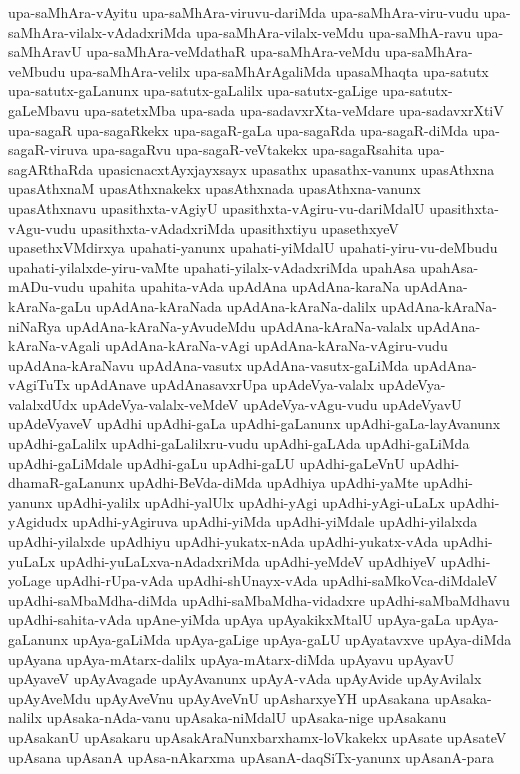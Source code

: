 {upa-saMhAra-vAyitu
upa-saMhAra-viruvu-dariMda
upa-saMhAra-viru-vudu
upa-saMhAra-vilalx-vAdadxriMda
upa-saMhAra-vilalx-veMdu
upa-saMhA-ravu
upa-saMhAravU
upa-saMhAra-veMdathaR
upa-saMhAra-veMdu
upa-saMhAra-veMbudu
upa-saMhAra-velilx
upa-saMhArAgaliMda
upasaMhaqta
upa-satutx
upa-satutx-gaLanunx
upa-satutx-gaLalilx
upa-satutx-gaLige
upa-satutx-gaLeMbavu
upa-satetxMba
upa-sada
upa-sadavxrXta-veMdare
upa-sadavxrXtiV
upa-sagaR
upa-sagaRkekx
upa-sagaR-gaLa
upa-sagaRda
upa-sagaR-diMda
upa-sagaR-viruva
upa-sagaRvu
upa-sagaR-veVtakekx
upa-sagaRsahita
upa-sagARthaRda
upasicnacxtAyxjayxsayx
upasathx
upasathx-vanunx
upasAthxna
upasAthxnaM
upasAthxnakekx
upasAthxnada
upasAthxna-vanunx
upasAthxnavu
upasithxta-vAgiyU
upasithxta-vAgiru-vu-dariMdalU
upasithxta-vAgu-vudu
upasithxta-vAdadxriMda
upasithxtiyu
upasethxyeV
upasethxVMdirxya
upahati-yanunx
upahati-yiMdalU
upahati-yiru-vu-deMbudu
upahati-yilalxde-yiru-vaMte
upahati-yilalx-vAdadxriMda
upahAsa
upahAsa-mADu-vudu
upahita
upahita-vAda
upAdAna
upAdAna-karaNa
upAdAna-kAraNa-gaLu
upAdAna-kAraNada
upAdAna-kAraNa-dalilx
upAdAna-kAraNa-niNaRya
upAdAna-kAraNa-yAvudeMdu
upAdAna-kAraNa-valalx
upAdAna-kAraNa-vAgali
upAdAna-kAraNa-vAgi
upAdAna-kAraNa-vAgiru-vudu
upAdAna-kAraNavu
upAdAna-vasutx
upAdAna-vasutx-gaLiMda
upAdAna-vAgiTuTx
upAdAnave
upAdAnasavxrUpa
upAdeVya-valalx
upAdeVya-valalxdUdx
upAdeVya-valalx-veMdeV
upAdeVya-vAgu-vudu
upAdeVyavU
upAdeVyaveV
upAdhi
upAdhi-gaLa
upAdhi-gaLanunx
upAdhi-gaLa-layAvanunx
upAdhi-gaLalilx
upAdhi-gaLalilxru-vudu
upAdhi-gaLAda
upAdhi-gaLiMda
upAdhi-gaLiMdale
upAdhi-gaLu
upAdhi-gaLU
upAdhi-gaLeVnU
upAdhi-dhamaR-gaLanunx
upAdhi-BeVda-diMda
upAdhiya
upAdhi-yaMte
upAdhi-yanunx
upAdhi-yalilx
upAdhi-yalUlx
upAdhi-yAgi
upAdhi-yAgi-uLaLx
upAdhi-yAgidudx
upAdhi-yAgiruva
upAdhi-yiMda
upAdhi-yiMdale
upAdhi-yilalxda
upAdhi-yilalxde
upAdhiyu
upAdhi-yukatx-nAda
upAdhi-yukatx-vAda
upAdhi-yuLaLx
upAdhi-yuLaLxva-nAdadxriMda
upAdhi-yeMdeV
upAdhiyeV
upAdhi-yoLage
upAdhi-rUpa-vAda
upAdhi-shUnayx-vAda
upAdhi-saMkoVca-diMdaleV
upAdhi-saMbaMdha-diMda
upAdhi-saMbaMdha-vidadxre
upAdhi-saMbaMdhavu
upAdhi-sahita-vAda
upAne-yiMda
upAya
upAyakikxMtalU
upAya-gaLa
upAya-gaLanunx
upAya-gaLiMda
upAya-gaLige
upAya-gaLU
upAyatavxve
upAya-diMda
upAyana
upAya-mAtarx-dalilx
upAya-mAtarx-diMda
upAyavu
upAyavU
upAyaveV
upAyAvagade
upAyAvanunx
upAyA-vAda
upAyAvide
upAyAvilalx
upAyAveMdu
upAyAveVnu
upAyAveVnU
upAsharxyeYH
upAsakana
upAsaka-nalilx
upAsaka-nAda-vanu
upAsaka-niMdalU
upAsaka-nige
upAsakanu
upAsakanU
upAsakaru
upAsakAraNunxbarxhamx-loVkakekx
upAsate
upAsateV
upAsana
upAsanA
upAsa-nAkarxma
upAsanA-daqSiTx-yanunx
upAsanA-para
}
